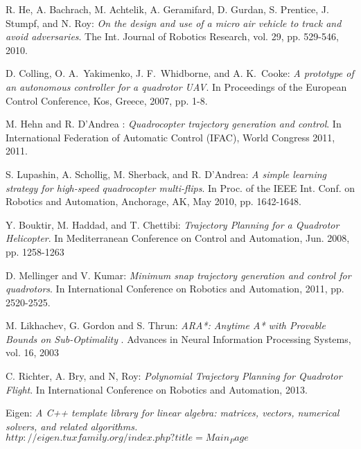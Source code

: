 
\begin{thebibliography}{99}



 {\sc R. He, A. Bachrach, M. Achtelik, A. Geramifard, D. Gurdan, S. Prentice,
J. Stumpf, and N. Roy}: 
{\it On the design and use of a micro air
vehicle to track and avoid adversaries}. The Int. Journal of Robotics
Research, vol. 29, pp. 529-546, 2010.


 {\sc D. Colling, O. A.~Yakimenko, J. F.~Whidborne, and A. K.~Cooke}:
{\it A prototype of an autonomous controller for a quadrotor UAV}. In
Proceedings of the European Control Conference, Kos, Greece, 2007,
pp. 1-8.


 {\sc M. Hehn and R. D'Andrea }:
{\it Quadrocopter trajectory generation and control}. In
International Federation of Automatic Control (IFAC), World Congress 2011, 2011.


 {\sc S. Lupashin, A. Schollig, M. Sherback, and R. D'Andrea}:
 {\it A simple learning strategy for high-speed quadrocopter multi-flips}.
In Proc. of the IEEE Int. Conf. on Robotics and Automation, Anchorage, AK,
May 2010, pp. 1642-1648.


 {\sc Y. Bouktir, M. Haddad, and T. Chettibi}:
{\it Trajectory Planning for a
Quadrotor Helicopter}. In Mediterranean Conference on Control and
Automation, Jun. 2008, pp. 1258-1263


 {\sc D. Mellinger and V. Kumar}: 
{\it Minimum snap trajectory generation and
control for quadrotors}. In International Conference on Robotics and
Automation, 2011, pp. 2520-2525.

 {\sc M. Likhachev, G. Gordon and S. Thrun}: 
{\it  ARA*: Anytime A* with Provable Bounds on Sub-Optimality }.
Advances in Neural Information
Processing Systems, vol. 16, 2003

 {\sc C. Richter,  A. Bry, and N, Roy}: 
{\it  Polynomial Trajectory Planning
for Quadrotor Flight}.
In International Conference on Robotics and
Automation, 2013.

 {\sc Eigen}: 
{\it  A C++ template library for linear algebra: matrices, vectors, numerical solvers, and related algorithms.}\newline
\href{http://eigen.tuxfamily.org/index.php?title=Main_Page}{$http://eigen.tuxfamily.org/index.php?title=Main_Page$}

\end{thebibliography}
